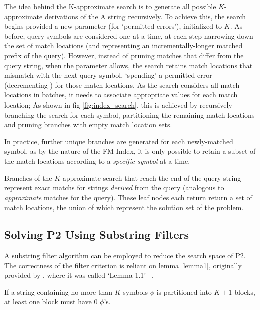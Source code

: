 The idea behind the \gls{K-approximate} search is to generate all possible $K$-approximate derivations of the A string recursively. To achieve this, the search begins provided a new parameter  (for `permitted errors'), initialized to $K$. As before, query symbols are considered one at a time, at each step narrowing down the set of match locations (and representing an incrementally-longer matched prefix of the query). However, instead of pruning matches that differ from the query string, when the  parameter allows, the search retains match locations that \gls{mismatch} with the next query symbol, `spending' a permitted error (decrementing ) for those match locations. As the search considers all match locations in batches, it needs to associate appropriate  values for each match location; As shown in fig \ref{fig:index_search}, this is achieved by recursively branching the search for each symbol, partitioning the remaining match locations and pruning branches with empty match location sets.



In practice, further unique branches are generated for each newly-matched symbol, as by the nature of the FM-Index, it is only possible to retain a subset of the match locations according to a \textit{specific symbol} at a time. 



Branches of the $K$-approximate search that reach the end of the query string represent \glspl{exact match} for strings \textit{derived} from the query (analogous to \textit{approximate} matches for the query). These leaf nodes each return return a set of match locations, the union of which represent the solution set of the problem.







\subsection{Solving P2 Using Substring Filters} \label{p2substring}

A \gls{substring filter} algorithm can be employed to reduce the search space of P2. The correctness of the \gls{filter criterion} is reliant on lemma \ref{lemma1}, originally provided by \kark{}, where it was called `Lemma 1.1'~\cite{kark2007} .

\begin{lemma}
\label{lemma1}
If a string containing no more than $K$ symbols $\phi{}$ is partitioned into $K+1$ blocks, at least one block must have $0$ $\phi{}$'s.
\end{lemma}

